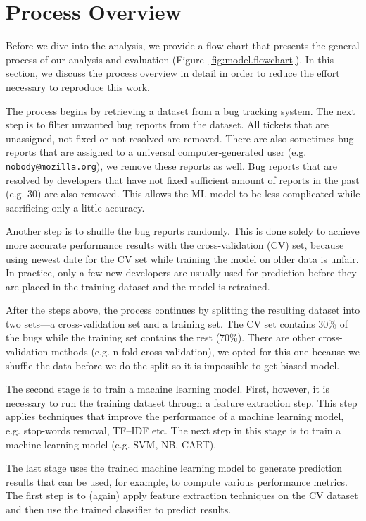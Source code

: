 \section{Process Overview}

Before we dive into the analysis, we provide a flow chart that presents the general process of our analysis and evaluation (Figure~\ref{fig:model.flowchart}). In this section, we discuss the process overview in detail in order to reduce the effort necessary to reproduce this work.

The process begins by retrieving a dataset from a bug tracking system. The next step is to filter unwanted bug reports from the dataset. All tickets that are unassigned, not fixed or not resolved are removed. There are also sometimes bug reports that are assigned to a universal computer-generated user (e.g. \texttt{nobody@mozilla.org}), we remove these reports as well. Bug reports that are resolved by developers that have not fixed sufficient amount of reports in the past (e.g. 30) are also removed. This allows the ML model to be less complicated while sacrificing only a little accuracy.

Another step is to shuffle the bug reports randomly. This is done solely to achieve more accurate performance results with the cross-validation (CV) set, because using newest date for the CV set while training the model on older data is unfair. In practice, only a few new developers are usually used for prediction before they are placed in the training dataset and the model is retrained.

After the steps above, the process continues by splitting the resulting dataset into two sets---a cross-validation set and a training set. The CV set contains 30\% of the bugs while the training set contains the rest (70\%). There are other cross-validation methods (e.g. n-fold cross-validation), we opted for this one because we shuffle the data before we do the split so it is impossible to get biased model.

The second stage is to train a machine learning model. First, however, it is necessary to run the training dataset through a feature extraction step. This step applies techniques that improve the performance of a machine learning model, e.g. stop-words removal, TF--IDF etc. The next step in this stage is to train a machine learning model (e.g. SVM, NB, CART).

The last stage uses the trained machine learning model to generate prediction results that can be used, for example, to compute various performance metrics. The first step is to (again) apply feature extraction techniques on the CV dataset and then use the trained classifier to predict results.

